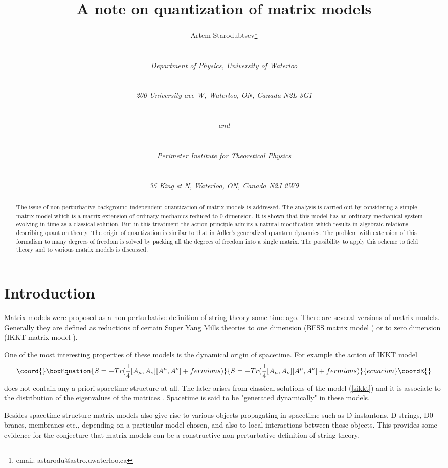 \documentclass[a4paper,11pt]{article}
\title{A note on quantization of matrix models}
\author{Artem Starodubtsev\thanks{email: astarodu@astro.uwaterloo.ca} \\
 \\ \centerline{\footnotesize \it Department of Physics, University of Waterloo} \\ \centerline{\footnotesize \it 200
University ave W, Waterloo, ON, Canada N2L 3G1} \\
\centerline{\footnotesize \it and} \\
\centerline{\footnotesize \it Perimeter Institute for
Theoretical Physics} \\
\centerline{\footnotesize \it 35 King st N, Waterloo, ON, Canada
N2J 2W9 }}
\date{}
\begin{document}
\maketitle

\begin{abstract}
The issue of non-perturbative background independent quantization
of matrix models is addressed. The analysis is carried out by
considering a simple matrix model which is a matrix extension of
ordinary mechanics reduced to 0 dimension.   It is shown that this
model has an ordinary mechanical system  evolving in time as a
classical solution. But in this treatment the action principle
admits a natural modification which results in algebraic relations
describing quantum theory. The origin of quantization is similar
to that in Adler's generalized quantum dynamics. The problem with
extension of this formalism to many degrees of freedom is solved
by packing all the degrees of freedom into a single matrix. The
possibility to apply this scheme to field theory and to various
matrix models is discussed.
\end{abstract}

\section{Introduction}
Matrix models were proposed as a non-perturbative definition of
string theory some time ago. There are several versions of matrix
models. Generally they are defined as reductions of certain Super
Yang Mills theories to one dimension (BFSS matrix model
\cite{BFSS}) or to zero dimension (IKKT matrix model \cite{IKKT}).

One of the most interesting properties of these models is the
dynamical origin of spacetime. For example the action of IKKT
model
\begin{equation}\coord{}\boxEquation{
S=-Tr ( \frac{1}{4} [A_\mu,A_\nu][A^\mu,A^\nu] + fermions )
\label{sikkt}
}{
S=-Tr ( \frac{1}{4} [A_\mu,A_\nu][A^\mu,A^\nu] + fermions )
}{ecuacion}\coordE{}\end{equation}
does not contain any a priori spacetime structure at all. The
later arises from classical solutions of the model (\ref{sikkt})
and it is associate to the distribution of the eigenvalues of the
matrices \coordHE{} \cite{stiib}. Spacetime is said to be "generated
dynamically" in these models.

Besides spacetime structure matrix models also give rise to
various objects propagating in spacetime such as D-instantons,
D-strings, D0-branes, membranes etc., depending on a particular
model chosen, and also to local interactions between those
objects. This provides some evidence for the conjecture that
matrix models can be a constructive non-perturbative definition of
string theory.
\end{document}
